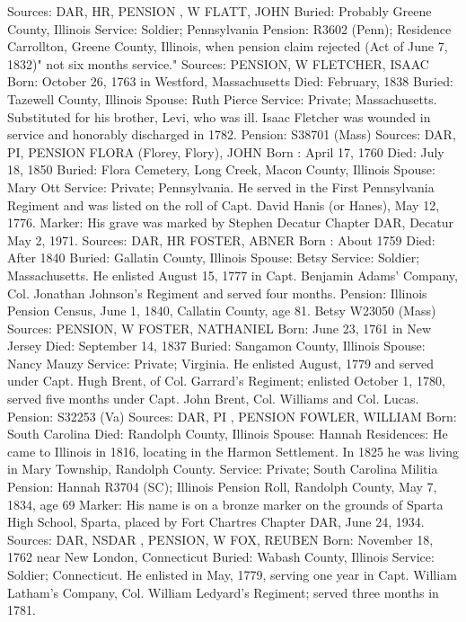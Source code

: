 Sources: DAR, HR, PENSION , W 
FLATT, JOHN 
Buried: Probably Greene County, Illinois 
Service: Soldier; Pennsylvania 
Pension: R3602 (Penn); 
Residence Carrollton, Greene County, Illinois, when pension claim rejected (Act of June 7, 1832)" not six months service." 
Sources: PENSION, W 
FLETCHER, ISAAC 
Born: October 26, 1763 in Westford, Massachusetts 
Died: February, 1838 
Buried: Tazewell County, Illinois 
Spouse: Ruth Pierce 
Service: Private; Massachusetts. Substituted for his brother, Levi, who was ill. Isaac Fletcher was wounded in service and honorably discharged in 1782. 
Pension: S38701 (Mass) Sources: DAR, PI, PENSION 
FLORA (Florey, Flory), JOHN 
Born : April 17, 1760 
Died: July 18, 1850 Buried: Flora Cemetery, Long Creek, Macon County, Illinois 
Spouse: Mary Ott 
Service: Private; Pennsylvania. He served in the First Pennsylvania Regiment and was listed on the roll of Capt. David Hanis (or Hanes), May 12, 1776. 
Marker: His grave was marked by Stephen Decatur Chapter DAR, Decatur May 2, 1971. 
Sources: DAR, HR 
FOSTER, ABNER 
Born : About 1759 Died: After 1840 
Buried: Gallatin County, Illinois  
Spouse: Betsy 
Service: Soldier; Massachusetts. He enlisted August 15, 1777 in Capt. Benjamin Adams' Company, Col. Jonathan Johnson's Regiment and served four months. 
Pension: Illinois Pension Census, June 1, 1840, Callatin County, age 81. Betsy W23050 (Mass) 
Sources: PENSION, W 
FOSTER, NATHANIEL 
Born: June 23, 1761 in New Jersey 
Died: September 14, 1837 
Buried: Sangamon County, Illinois 
Spouse: Nancy Mauzy 
Service: Private; Virginia. He enlisted August, 1779 and served under Capt. Hugh Brent, of Col. Garrard's Regiment; enlisted October 1, 1780, served five months under Capt. John Brent, Col. Williams and Col. Lucas. 
Pension: S32253 (Va) 
Sources: DAR, PI , PENSION 
FOWLER, WILLIAM 
Born: South Carolina 
Died: Randolph County, Illinois 
Spouse: Hannah 
Residences: He came to Illinois in 1816, locating in the Harmon Settlement. In 1825 he was living in Mary Township, Randolph County. Service: Private; South Carolina Militia 
Pension: Hannah R3704 (SC); Illinois Pension Roll, Randolph County, May 7, 1834, age 69 
Marker: His name is on a bronze marker on the grounds of Sparta High School, Sparta, placed by Fort Chartres Chapter DAR, June 24, 1934. 
Sources: DAR, NSDAR , PENSION, W 
FOX, REUBEN 
Born: November 18, 1762 near New London, Connecticut 
Buried: Wabash County, Illinois Service: 
Soldier; Connecticut. He enlisted in May, 1779, serving one year in Capt. William Latham's Company, Col. William Ledyard's Regiment; served three months in 1781. 
